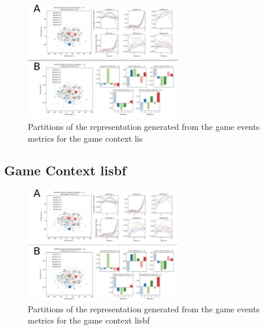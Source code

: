 \begin{figure}[!htb]
\includegraphics[width=0.6\textwidth]{images/appendix_D/clust_even_lis.png}
\centering
\caption[Partitions of the representation generated from the game events metrics for the game context lis]{Partitions of the representation generated from the game events metrics for the game context lis}
\end{figure}
\FloatBarrier

\subsection{Game Context lisbf}
\label{even_clust_lisbf}

\begin{figure}[!htb]
\includegraphics[width=0.6\textwidth]{images/appendix_D/clust_even_lisbf.png}
\centering
\caption[Partitions of the representation generated from the game events metrics for the game context lisbf]{Partitions of the representation generated from the game events metrics for the game context lisbf}
\end{figure}
\FloatBarrier